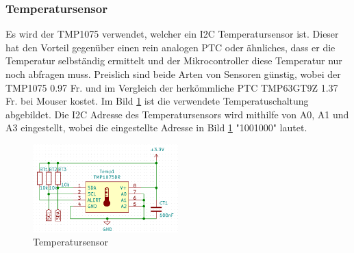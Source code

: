 \subsubsection{Temperatursensor}
Es wird der TMP1075 verwendet, welcher ein I2C Temperatursensor ist. Dieser hat den Vorteil gegenüber einen rein analogen PTC oder ähnliches, dass er die Temperatur selbständig ermittelt und der Mikrocontroller diese Temperatur nur noch abfragen muss. Preislich sind beide Arten von Sensoren günstig, wobei der TMP1075 0.97 Fr. und im Vergleich der herkömmliche  PTC TMP63GT9Z 1.37 Fr. bei Mouser kostet. Im Bild \ref{pic: Temperatursensor} ist die verwendete Temperatuschaltung abgebildet. Die I2C Adresse des Temperatursensors wird mithilfe von A0, A1 und A3 eingestellt, wobei die eingestellte Adresse in Bild \ref{pic: Temperatursensor} "1001000" lautet.  
\begin{figure}[h!]
	\centering
	\includegraphics[width=0.5\textwidth]{graphics/shematics_sensor_Temp.png}
	\caption{Temperatursensor}
	\label{pic: Temperatursensor}
\end{figure}
